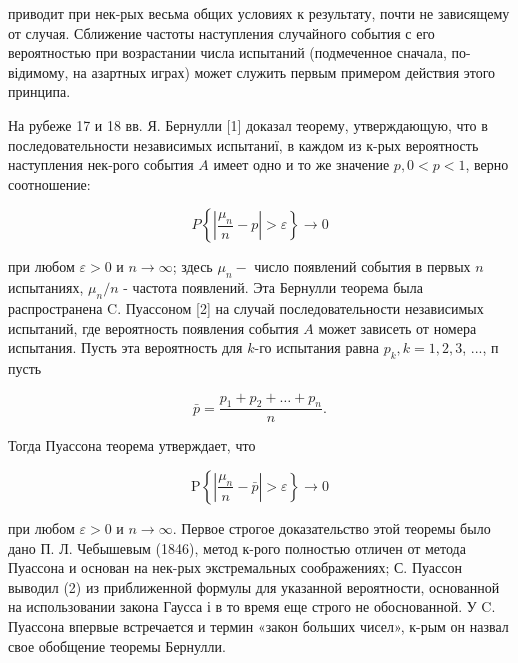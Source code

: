 \documentclass[10pt]{article}
\begin{document}
приводит при нек-рых весьма общих условиях к результату, почти не зависящему от случая. Сближение частоты наступления случайного события с его вероятностью при возрастании числа испытаний (подмеченное сначала, по-відимому, на азартных играх) может служить первым примером действия этого принципа.



На рубеже 17 и 18 вв. Я. Бернулли [1] доказал теорему, утверждающую, что в последовательности независимых испытаниї, в каждом из к-рых вероятность наступления нек-рого события $A$ имеет одно и то же значение $p, 0<p<1$, верно соотношение:



\[

P\left\{\left|\frac{\mu_{n}}{n}-p\right|>\varepsilon\right\} \rightarrow 0

\]



при любом $\varepsilon>0$ и $n \rightarrow \infty$; здесь $\mu_{n}-$ число появлений события в первых $n$ испытаниях, $\mu_{n} / n$ - частота появлений. Эта Бернулли теорема была распространена C. Пуассоном [2] на случай последовательности независимых испытаний, где вероятность появления события $A$ может зависеть от номера испытания. Пусть эта вероятность для $k$-го испытания равна $p_{k}, k=1,2,3$, ..., п пусть



\[

\bar{p}=\frac{p_{1}+p_{2}+\ldots+p_{n}}{n} .

\]



Тогда Пуассона теорема утверждает, что



\[

\mathrm{P}\left\{\left|\frac{\mu_{n}}{n}-\bar{p}\right|>\varepsilon\right\} \rightarrow 0

\]



при любом $\varepsilon>0$ и $n \rightarrow \infty$. Первое строгое доказательство этой теоремы было дано П. Л. Чебышевым (1846), метод к-рого полностью отличен от метода Пуассона и основан на нек-рых экстремальных соображениях; С. Пуассон выводил (2) из приближенной формулы для указанной вероятности, основанной на использовании закона Гаусса і в то время еще строго не обоснованной. У C. Пуассона впервые встречается и термин «закон больших чисел», к-рым он назвал свое обобщение теоремы Бернулли.
\end{document}
